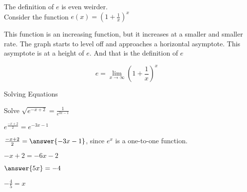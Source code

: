 \documentclass{ximera}
\begin{document}
The definition of $e$ is even weirder. \\


Consider the function $e(x) = \left(1 + \frac{1}{x}\right)^x$



\begin{center}
\end{center}


This function is an increasing function, but it increases at a smaller and smaller rate.  The graph starts to level off and approaches a horizontal asymptote.  This asymptote is at a height of $e$.  And that is the definition of $e$


\[   e = \lim_{x \to \infty}  \left(1 + \frac{1}{x}\right)^x      \]


















\begin{example} Solving Equations


Solve $\sqrt{e^{-x + 2}} = \frac{1}{e^{3x-1}}$


\begin{explanation}

$e^{\tfrac{-x + 2}{2}}= e^{-3x-1}$


$\frac{-x + 2}{2} = \answer{-3x-1}$, since $e^x$ is a one-to-one function.

$-x + 2 = -6x - 2$

$\answer{5x} = -4$


$-\frac{4}{5} = x$
\end{explanation}
\end{example}
\end{document}
